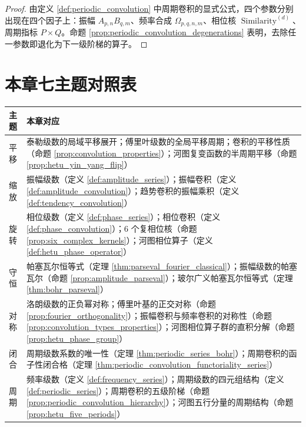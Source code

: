 \begin{proof}
由定义 \ref{def:periodic_convolution} 中周期卷积的显式公式，四个参数分别出现在四个因子上：振幅 $A_{p,n}B_{q,m}$、频率合成 $\Omega_{p,q,n,m}$、相位核 $\operatorname{Similarity}^{(d)}$、周期指标 $P \times Q$。命题 \ref{prop:periodic_convolution_degenerations} 表明，去除任一参数即退化为下一级阶梯的算子。
\end{proof}

\section*{本章七主题对照表}

\begin{center}
\renewcommand{\arraystretch}{1.3}
\begin{tabular}{>{\centering\arraybackslash}p{2.2cm}>{\centering\arraybackslash}p{10.5cm}}
\toprule
主题 & 本章对应 \\
\midrule
平移 & 泰勒级数的局域平移展开；傅里叶级数的全局平移周期；卷积的平移性质（命题 \ref{prop:convolution_properties}）；河图复变函数的半周期平移（命题 \ref{prop:hetu_yin_yang_flip}） \\
缩放 & 振幅级数（定义 \ref{def:amplitude_series}）；振幅卷积（定义 \ref{def:amplitude_convolution}）；趋势卷积的振幅乘积（定义 \ref{def:tendency_convolution}） \\
旋转 & 相位级数（定义 \ref{def:phase_series}）；相位卷积（定义 \ref{def:phase_convolution}）；6 个复相位核（命题 \ref{prop:six_complex_kernels}）；河图相位算子（定义 \ref{def:hetu_phase_operator}） \\
守恒 & 帕塞瓦尔恒等式（定理 \ref{thm:parseval_fourier_classical}）；振幅级数的帕塞瓦尔（命题 \ref{prop:amplitude_parseval}）；玻尔广义帕塞瓦尔恒等式（定理 \ref{thm:bohr_parseval}） \\
对称 & 洛朗级数的正负幂对称；傅里叶基的正交对称（命题 \ref{prop:fourier_orthogonality}）；振幅卷积与频率卷积的对称性（命题 \ref{prop:convolution_types_properties}）；河图相位算子群的直积分解（命题 \ref{prop:hetu_phase_group}） \\
闭合 & 周期级数系数的唯一性（定理 \ref{thm:periodic_series_bohr}）；周期卷积的函子性闭合格（定理 \ref{thm:periodic_convolution_functoriality_series}） \\
周期 & 频率级数（定义 \ref{def:frequency_series}）；周期级数的四元组结构（定义 \ref{def:periodic_series}）；周期卷积的五级阶梯（命题 \ref{prop:periodic_convolution_hierarchy}）；河图五行分量的周期结构（命题 \ref{prop:hetu_five_periods}） \\
\bottomrule
\end{tabular}
\end{center}

